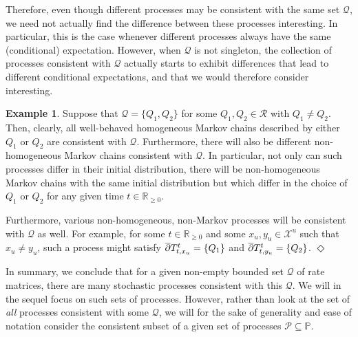 \documentclass[10pt,a4paper]{paper}
\theoremstyle{definition}
\newtheorem{exmp}{Example}%
\newcommand{\reals}{\mathbb{R}}
\newcommand{\realsnonneg}{\reals_{\geq 0}}
\newcommand{\states}{\mathcal{X}}
\newcommand{\processes}{\mathbb{P}}
\newcommand{\rateset}{\mathcal{Q}}
\newcommand{\exampleend}{\hfill$\Diamond$}
\begin{document}

Therefore, even though different processes may be consistent with the same set $\rateset$, we need not actually find the difference between these processes interesting. In particular, this is the case whenever different processes always have the same (conditional) expectation. However, when $\rateset$ is not singleton, the collection of processes consistent with $\rateset$ actually starts to exhibit differences that lead to different conditional expectations, and that we would therefore consider interesting.

\begin{exmp}\label{example:rateset_not_singleton}
Suppose that $\rateset=\{Q_1,Q_2\}$ for some $Q_1,Q_2\in\mathcal{R}$ with $Q_1\neq Q_2$. Then, clearly, all well-behaved homogeneous Markov chains described by either $Q_1$ or $Q_2$ are consistent with $\rateset$. Furthermore, there will also be different non-homogeneous Markov chains consistent with $\rateset$. In particular, not only can such processes differ in their initial distribution, there will be non-homogeneous Markov chains with the same initial distribution but which differ in the choice of $Q_1$ or $Q_2$ for any given time $t\in\realsnonneg$. 

Furthermore, various non-homogeneous, non-Markov processes will be consistent with $\rateset$ as well. For example, for some $t\in\realsnonneg$ and some $x_u,y_u\in\states^u$ such that $x_u\neq y_u$, such a process might satisfy $\smash{\overline{\partial}}T_{t,x_u}^t=\{Q_1\}$ and $\smash{\overline{\partial}}T_{t,y_u}^t=\{Q_2\}$.
\exampleend
\end{exmp}

In summary, we conclude that for a given non-empty bounded set $\rateset$ of rate matrices, there are many stochastic processes consistent with this $\rateset$. We will in the sequel focus on such sets of processes. However, rather than look at the set of \emph{all} processes consistent with some $\rateset$, we will for the sake of generality and ease of notation consider the consistent subset of a given set of processes $\mathcal{P}\subseteq\processes$.

\end{document}
